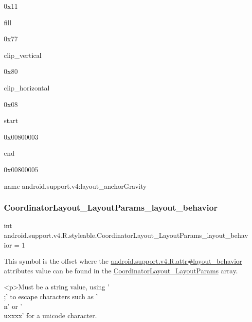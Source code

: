 0x11

{\ttfamily fill}

0x77

{\ttfamily clip\+\_\+vertical}

0x80

{\ttfamily clip\+\_\+horizontal}

0x08

{\ttfamily start}

0x00800003

{\ttfamily end}

0x00800005

name android.\+support.\+v4\+:layout\+\_\+anchor\+Gravity \mbox{\label{classandroid_1_1support_1_1v4_1_1R_1_1styleable_ab7698222e7d3cef07b5dfe63ccec5b53}} 
\subsubsection{\texorpdfstring{Coordinator\+Layout\+\_\+\+Layout\+Params\+\_\+layout\+\_\+behavior}{CoordinatorLayout\_LayoutParams\_layout\_behavior}}
{\footnotesize\ttfamily int android.\+support.\+v4.\+R.\+styleable.\+Coordinator\+Layout\+\_\+\+Layout\+Params\+\_\+layout\+\_\+behavior = 1\hspace{0.3cm}{\ttfamily [static]}}

This symbol is the offset where the \hyperlink{classandroid_1_1support_1_1v4_1_1R_1_1attr_ab0d50824521c62d51d34bec6a94acc92}{android.\+support.\+v4.\+R.\+attr\#layout\+\_\+behavior} attribute\textquotesingle{}s value can be found in the \hyperlink{classandroid_1_1support_1_1v4_1_1R_1_1styleable_a9b9df68895be97c43703c5d0a130e2d9}{Coordinator\+Layout\+\_\+\+Layout\+Params} array.

\begin{DoxyVerb}      <p>Must be a string value, using '\\;' to escape characters such as '\\n' or '\\uxxxx' for a unicode character.
\end{DoxyVerb}
 

